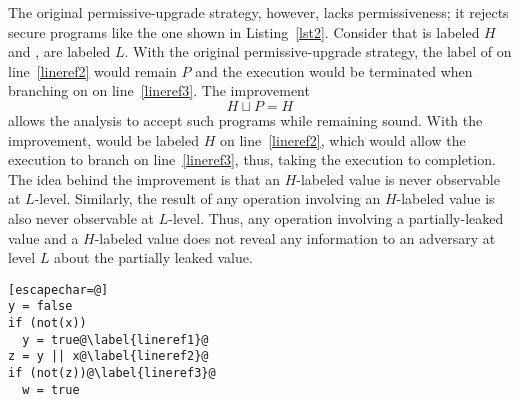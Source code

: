 The original permissive-upgrade strategy, however, lacks 
permissiveness; it rejects secure programs like the one shown in
Listing~\ref{lst2}. Consider that  is labeled $H$
and ,  are labeled $L$. With the original permissive-upgrade
strategy, the label of  on
line~\ref{lineref2} would remain $P$ and the execution would be
terminated when branching on  on line~\ref{lineref3}. The
improvement $$H \sqcup P = H$$ allows the analysis to accept such programs
while remaining sound. With the improvement,  would be labeled
$H$ on line~\ref{lineref2}, which would allow the execution to branch
on line~\ref{lineref3}, thus, 
taking the execution to completion. 
The idea behind the improvement is that an $H$-labeled value is
never observable at $L$-level. Similarly, the result of any operation
involving an $H$-labeled value is also never observable at
$L$-level. Thus, any operation involving a partially-leaked value and
a $H$-labeled value does not reveal any information to an adversary at
level $L$ about the partially leaked value. 

\begin{lstlisting}[float,label=lst2,caption=Example showing the
  impermissiveness of the original permissive-upgrade strategy][escapechar=@]
y = false
if (not(x))
  y = true@\label{lineref1}@
z = y || x@\label{lineref2}@
if (not(z))@\label{lineref3}@
  w = true
\end{lstlisting}



